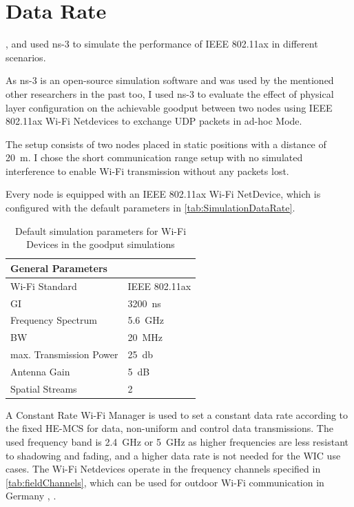 \section{Data Rate}
\label{sec:DataRate}
\cite{dolinska_new_2019}, \cite{rochim_performance_2020} and
\cite{behara_performance_2022} used ns-3 to simulate the performance of IEEE 802.11ax in different scenarios.

As ns-3 is an open-source simulation software and was used by the mentioned other researchers in the past too, I used ns-3
to evaluate the effect of physical layer configuration on the achievable goodput between two nodes using IEEE 802.11ax Wi-Fi Netdevices
to exchange \ac{UDP} packets in ad-hoc Mode.

The setup consists of two nodes placed in static positions with a distance of \SI{20}{\metre}.
I chose the short communication range setup with no simulated interference to enable Wi-Fi transmission without any packets lost.

Every node is equipped with an IEEE 802.11ax Wi-Fi NetDevice, which is configured with the default parameters in
\autoref{tab:SimulationDataRate}.
\begin{table}[H]
   \centering
   \begin{tabular}{p{6cm}p{4cm}}
      General Parameters & \\
      \midrule
      Wi-Fi Standard & IEEE 802.11ax\\
      \ac{GI} & \SI{3200}{\nano\second}\\
      Frequency Spectrum & \SI{5.6}{\giga\hertz}\\
      \ac{BW} & \SI{20}{\mega\hertz}\\
      max. Transmission Power & \SI{25}{\decibel}\\
      Antenna Gain & \SI{5}{\dB}\\
      Spatial Streams & 2\\
      \bottomrule
   \end{tabular}
   \caption{Default simulation parameters for Wi-Fi Devices in the goodput simulations}
   \label{tab:SimulationDataRate}
\end{table}

A Constant Rate Wi-Fi Manager is used to set a constant data rate according to the fixed \ac{HE}-\ac{MCS} for data, non-uniform and control data transmissions.
The used frequency band is \SI{2.4}{\giga\hertz} or \SI{5}{\giga\hertz} as higher frequencies are less resistant to shadowing and fading, and a higher data rate is not needed for the \ac{WIC} use cases.
The Wi-Fi Netdevices operate in the frequency channels specified in \autoref{tab:fieldChannels}, which can be used for
outdoor Wi-Fi communication in Germany \cite{freq_plan_24G}, \cite{freq_plan_5G}.

